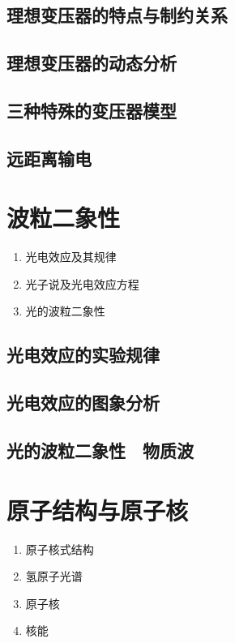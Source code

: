 \documentclass[cn,11pt,mac, simple]{elegantbook}
\begin{document}
\clearpage\section{理想变压器的特点与制约关系}

\clearpage\section{理想变压器的动态分析}

\clearpage\section{三种特殊的变压器模型}

\clearpage\section{远距离输电}

\chapter{波粒二象性}
\begin{enumerate}
   \item 光电效应及其规律
   \item 光子说及光电效应方程
   \item 光的波粒二象性
\end{enumerate}

\clearpage\section{光电效应的实验规律}

\clearpage\section{光电效应的图象分析}

\clearpage\section{光的波粒二象性　物质波}

\chapter{原子结构与原子核}
\begin{enumerate}
   \item 原子核式结构
   \item 氢原子光谱
   \item 原子核
   \item 核能
\end{enumerate}
\end{document}
